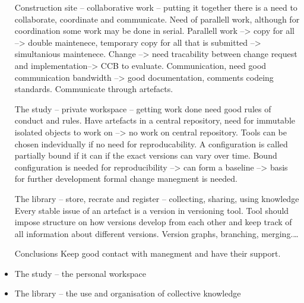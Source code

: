 \documentclass{article}
\begin{document}
    \begin{itemize}
    \item[Construction site -- collaborative work -- putting it together] there is a need to collaborate, coordinate and communicate. Need of parallell work, although for coordination some work may be done in serial. Parallell work --> copy for all --> double maintenece, temporary copy for all that is submitted --> simultanious maintenece. Change --> need tracability between change request and implementation--> CCB to evaluate. Communication, need good communication bandwidth --> good documentation, comments codeing standards. Communicate through artefacts.
    \item[ The study -- private workspace -- getting work done] need good rules of conduct and rules.
    Have artefacts in a central repository, need for immutable isolated objects to work on --> no work on central repository. Tools can be chosen indevidually if no need for reproducability. A configuration is called partially bound if it can if the exact versions can vary over time. Bound configuration is needed for reproducibility --> can form a baseline --> basis for further development formal change manegment is needed.
    \item[ The library -- store, recrate and register -- collecting, sharing, using knowledge]
    Every stable issue of an artefact is a version in versioning tool. Tool should impose structure on how versions develop from each other and keep track of all information about different versions. Version graphs, branching, merging.\ldots
    \item[Conclusions] Keep good contact with manegment and have their support.
    \item The study -- the personal workspace
    \item The library -- the use and organisation of collective knowledge
    \end{itemize}
\end{document}
